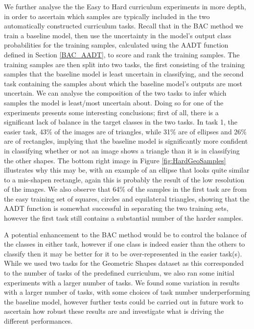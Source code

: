 We further analyse the the Easy to Hard curriculum experiments in more depth, in order to ascertain which samples are typically included in the two automatically constructed curriculum tasks. Recall that in the BAC method we train a baseline model, then use the uncertainty in the model's output class probabilities for the training samples, calculated using the AADT function defined in Section \ref{BAC_AADT}, to score and rank the training samples. The training samples are then split into two tasks, the first consisting of the training samples that the baseline model is least uncertain in classifying, and the second task containing the samples about which the baseline model's outputs are most uncertain. We can analyse the composition of the two tasks to infer which samples the model is least/most uncertain about. Doing so for one of the experiments presents some interesting conclusions; first of all, there is a significant lack of balance in the target classes in the two tasks. In task 1, the easier task, 43\% of the images are of triangles, while 31\% are of ellipses and 26\% are of rectangles, implying that the baseline model is significantly more confident in classifying whether or not an image shows a triangle than it is in classifying the other shapes. The bottom right image in Figure \ref{fig:HardGeoSamples} illustrates why this may be, with an example of an ellipse that looks quite similar to a mis-shapen rectangle, again this is probably the result of the low resolution of the images. We also observe that 64\% of the samples in the first task are from the easy training set of squares, circles and equilateral triangles, showing that the AADT function is somewhat successful in separating the two training sets, however the first task still contains a substantial number of the harder samples.

A potential enhancement to the BAC method would be to control the balance of the classes in either task, however if one class is indeed easier than the others to classify then it may be better for it to be over-represented in the easier task(s). While we used two tasks for the Geometric Shapes dataset as this corresponded to the number of tasks of the predefined curriculum, we also ran some initial experiments with a larger number of tasks. We found some variation in results with a larger number of tasks, with some choices of task number underperforming the baseline model, however further tests could be carried out in future work to ascertain how robust these results are and investigate what is driving the different performances.

